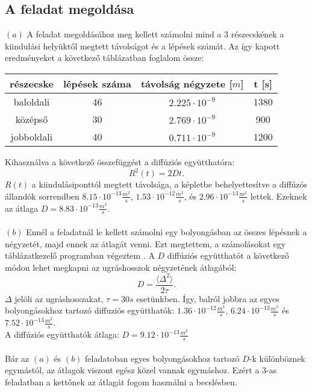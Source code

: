 \documentclass[12pt]{article}
\begin{document}
 
 \subsection*{A feladat megoldása}
$(a) $ A feladat megoldásához meg kellett számolni mind a 3 részecskének a kiindulási helyüktől megtett távolságot és a lépések számát. Az így kapott eredményeket a következő táblázatban foglalom össze:
\begin{center}
\begin{tabular}{|c|c|c|c|}\hline

részecske & lépések száma & távolság négyzete [$ m$]& t [s]\\ \hline 
baloldali &46 &$2.225 \cdot 10^{-9}$ &1380 \\ \hline
középső &30 & $2.769 \cdot 10^{-9}$& 900 \\ \hline
jobboldali &40  &$0.711\cdot 10^{-9}$ &1200   \\ \hline

\end{tabular}
\end{center}

Kihasználva a következő összefüggést a diffúziós együtthatóra:
$$R^2(t) = 2 D t.$$
$R(t)$ a kiindulásiponttól megtett távolsága,  a képletbe behelyettesítve a diffúzós állandók sorrendben $8.15\cdot 10^{-13} \frac{m^2}{s}$, $1.53\cdot 10^{-12} \frac{m^2}{s}$, és $2.96\cdot 10^{-13} \frac{m^2}{s}$ lettek. Ezeknek az átlaga $D = 8.83\cdot 10^{-13} \frac{m^2}{s}$. \\ \\
$(b)$ Ennél a feladatnál le kellett számolni egy bolyongásban az összes lépésnek a négyzetét, majd ennek az átlagát venni. Ezt megtettem, a számolásokat egy táblázatkezelő programban végeztem \cite{wik} . A  $D$ diffúziós együtthatót a következő módon lehet megkapni az ugráshosszok négyzetének átlagából:
$$D = \frac{\langle \Delta ^2 \rangle }{2\tau}.$$
$\Delta$ jelöli az ugráshosszakat, $\tau = 30 s$ esetünkben. Így, balról jobbra az egyes bolyongásokhoz tartozó diffuziós együtthatók: $1.36\cdot 10^{-12}\frac{m^2}{s}$, $6.24\cdot 10^{-13} \frac{m^2}{s}$ és $7.52\cdot 10^{-13} \frac{m^2}{s}$. \\ A diffúziós együtthatók átlaga: $D = 9.12\cdot 10^{-13} \frac{m^2}{s}$
\\\\
Bár az $(a)$ és  $(b)$ feladatoban egyes bolyongásokhoz tartozó $D$-k különböznek egymástól, az átlagok viszont egész közel vannak egymáshoz. Ezért a  $3$-as feladatban a kettőnek az átlagát fogom használni a becslésben.
\newpage
\end{document}
